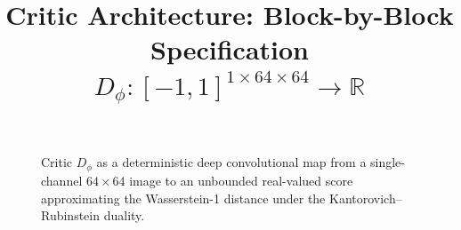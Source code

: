 \documentclass{tex-notes}
\title{\vspace{-2em}Critic Architecture: Block-by-Block Specification\\
  {\large \textnormal{%
    $D_\phi : [-1, 1]^{1 \times 64 \times 64} \longrightarrow \mathbb{R}$%
  }}}
\author{}
\date{}
\begin{document}
\maketitle
\vspace{-2.5em}

\begin{figure}[h]
\centering
\resizebox{!}{0.78\textheight}{%
}
\caption{Critic $D_\phi$ as a deterministic deep convolutional map from a
single-channel $64 \times 64$ image to an unbounded real-valued score
approximating the Wasserstein-1 distance under the
Kantorovich--Rubinstein duality.}
\end{figure}


















\end{document}
